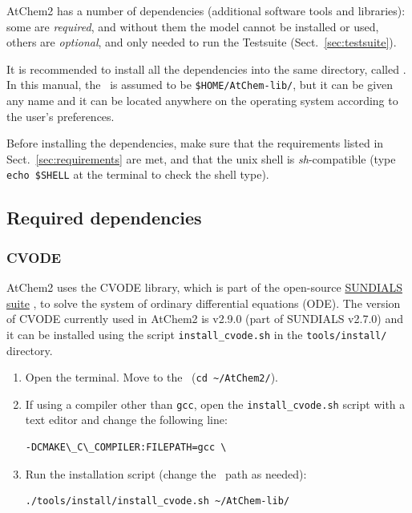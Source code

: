 AtChem2 has a number of dependencies (additional software tools and libraries): some are
\emph{required}, and without them the model cannot be installed or used, others are
\emph{optional}, and only needed to run the Testsuite (Sect.~\ref{sec:testsuite}).

It is recommended to install all the dependencies into the same directory, called \depdir. In
this manual, the \depdir\ is assumed to be \texttt{\$HOME/AtChem-lib/}, but it can be given
any name and it can be located anywhere on the operating system according to the user's
preferences.

Before installing the dependencies, make sure that the requirements listed in
Sect.~\ref{sec:requirements} are met, and that the unix shell is \emph{sh}-compatible (type
\verb|echo $SHELL| at the terminal to check the shell type).

\subsection{Required dependencies} \label{subsec:required-dependencies}

\subsubsection{CVODE}

AtChem2 uses the CVODE library, which is part of the open-source
\href{https://computing.llnl.gov/projects/sundials}{SUNDIALS suite}
\citep{hindmarsh_2005}, to solve the system of ordinary differential
equations (ODE). The version of CVODE currently used in AtChem2 is
v2.9.0 (part of SUNDIALS v2.7.0) and it can be installed using the script
\texttt{install\_cvode.sh} in the \texttt{tools/install/} directory.

\begin{enumerate}
\item Open the terminal. Move to the \maindir\ (\verb|cd ~/AtChem2/|).
\item If using a compiler other than \texttt{gcc}, open the \texttt{install\_cvode.sh}
  script with a text editor and change the following line:
  \begin{Verbatim}[fontsize=\small]
  -DCMAKE\_C\_COMPILER:FILEPATH=gcc \
  \end{Verbatim}
\item Run the installation script (change the \depdir\ path as needed):
  \begin{Verbatim}[fontsize=\small]
  ./tools/install/install_cvode.sh ~/AtChem-lib/
  \end{Verbatim}
\end{enumerate}

